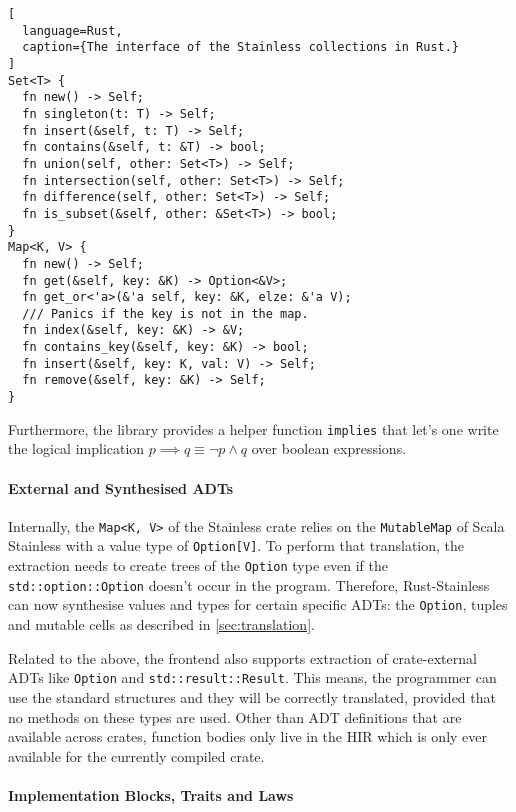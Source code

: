 \begin{lstlisting}[
  language=Rust,
  caption={The interface of the Stainless collections in Rust.}
]
Set<T> {
  fn new() -> Self;
  fn singleton(t: T) -> Self;
  fn insert(&self, t: T) -> Self;
  fn contains(&self, t: &T) -> bool;
  fn union(self, other: Set<T>) -> Self;
  fn intersection(self, other: Set<T>) -> Self;
  fn difference(self, other: Set<T>) -> Self;
  fn is_subset(&self, other: &Set<T>) -> bool;
}
Map<K, V> {
  fn new() -> Self;
  fn get(&self, key: &K) -> Option<&V>;
  fn get_or<'a>(&'a self, key: &K, elze: &'a V);
  /// Panics if the key is not in the map.
  fn index(&self, key: &K) -> &V;
  fn contains_key(&self, key: &K) -> bool;
  fn insert(&self, key: K, val: V) -> Self;
  fn remove(&self, key: &K) -> Self;
}
\end{lstlisting}

Furthermore, the library provides a helper function
\passthrough{\lstinline!implies!} that let's one write the logical
implication $p \implies q \equiv \neg{p} \land q$ over boolean expressions.


\paragraph{External and Synthesised ADTs}

Internally, the \lstinline!Map<K, V>! of the Stainless crate relies on
the \passthrough{\lstinline!MutableMap!} of Scala Stainless with a value
type of \passthrough{\lstinline!Option[V]!}. To perform that
translation, the extraction needs to create trees of the
\passthrough{\lstinline!Option!} type even if the
\passthrough{\lstinline!std::option::Option!} doesn't occur in the
program. Therefore, Rust-Stainless can now synthesise values and types
for certain specific ADTs: the \passthrough{\lstinline!Option!}, tuples
and mutable cells as described in \autoref{sec:translation}.

Related to the above, the frontend also supports extraction of
crate-external ADTs like \passthrough{\lstinline!Option!} and
\passthrough{\lstinline!std::result::Result!}. This means, the
programmer can use the standard structures and they will be correctly
translated, provided that no methods on these types are used. Other than
ADT definitions that are available across crates, function bodies only
live in the HIR which is only ever available for the currently compiled
crate.

\paragraph{Implementation Blocks, Traits and Laws}

